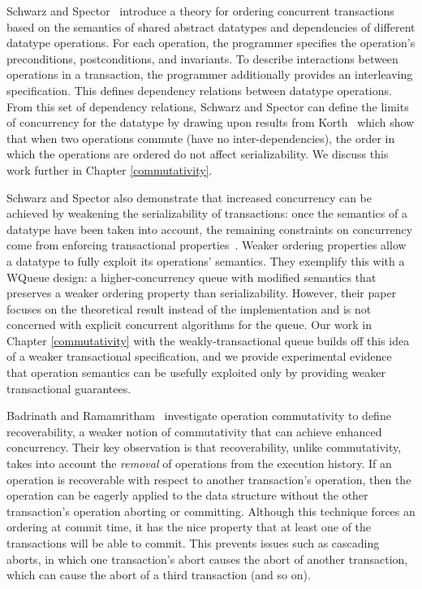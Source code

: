 Schwarz and Spector~\cite{schwarz} introduce a theory for ordering concurrent transactions based on the semantics of shared abstract datatypes and dependencies of different datatype operations. For each operation, the programmer specifies the operation's preconditions, postconditions, and invariants. To describe interactions between operations in a transaction, the programmer additionally provides an interleaving specification. This defines dependency relations between datatype operations. From this set of dependency relations, Schwarz and Spector can define the limits of concurrency for the datatype by drawing upon results from Korth~\cite{korth} which show that when two operations commute (have no inter-dependencies), the order in which the operations are ordered do not affect serializability. We discuss this work further in Chapter \ref{commutativity}. 

Schwarz and Spector also demonstrate that increased concurrency can be achieved by weakening the serializability of transactions: once the semantics of a datatype have been taken into account, the remaining constraints on concurrency come from enforcing transactional properties~\cite{kung}. Weaker ordering properties allow a datatype to fully exploit its operations' semantics. They exemplify this with a WQueue design: a higher-concurrency queue with modified semantics that preserves a weaker ordering property than serializability. However, their paper focuses on the theoretical result instead of the implementation and is not concerned with explicit concurrent algorithms for the queue. Our work in Chapter \ref{commutativity} with the weakly-transactional queue builds off this idea of a weaker transactional specification, and we provide experimental evidence that operation semantics can be usefully exploited only by providing weaker transactional guarantees.

Badrinath and Ramamritham~\cite{badrinath} investigate operation commutativity to define recoverability, a weaker notion of commutativity that can achieve enhanced concurrency. Their key observation is that recoverability, unlike commutativity, takes into account the \emph{removal} of operations from the execution history. If an operation is recoverable with respect to another transaction's operation, then the operation can be eagerly applied to the data structure without the other transaction's operation aborting or committing. Although this technique forces an ordering at commit time, it has the nice property that at least one of the transactions will be able to commit. This prevents issues such as cascading aborts, in which one transaction's abort causes the abort of another transaction, which can cause the abort of a third transaction (and so on).

